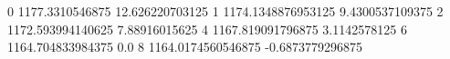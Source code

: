 0 1177.3310546875 12.626220703125
1 1174.1348876953125 9.4300537109375
2 1172.593994140625 7.88916015625
4 1167.819091796875 3.1142578125
6 1164.704833984375 0.0
8 1164.0174560546875 -0.6873779296875
